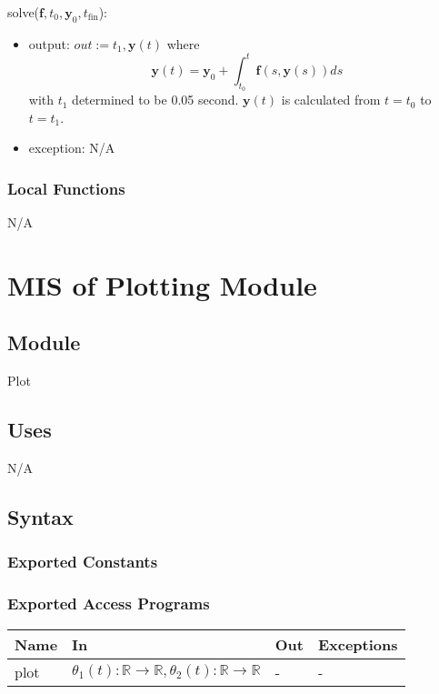 \documentclass[12pt, titlepage]{article}
\begin{document}
\noindent solve($\textbf{f}, t_0, \textbf{y}_0, t_\text{fin}$): 
\begin{itemize}
\item output: $out := t_1, \textbf{y}(t)$ where 
$$\textbf{y}(t) = \textbf{y}_0 + \int_{t_0}^{t} \textbf{f}(s, \textbf{y}(s)) ds$$ 
with $t_1$ determined to be 0.05 second.  $\textbf{y}(t)$ is
calculated from $t = t_0$ to $t = t_1$.
\item exception: N/A
\end{itemize}
\subsubsection{Local Functions}

N/A

\newpage
\section{MIS of Plotting Module} \label{PModule} 

\subsection{Module}
Plot
\subsection{Uses}
N/A
\subsection{Syntax}

\subsubsection{Exported Constants}

\subsubsection{Exported Access Programs}
\begin{center}
\begin{tabular}{p{2cm} p{8cm} p{2cm} p{2cm}}
\hline
\textbf{Name} & \textbf{In} & \textbf{Out} & \textbf{Exceptions} \\
\hline
plot & $\theta_1(t):\mathbb{R} \rightarrow \mathbb{R},
                 \theta_2(t):\mathbb{R} \rightarrow \mathbb{R}
                 $ & - & - \\
\hline
\end{tabular}
\end{center}
\end{document}
